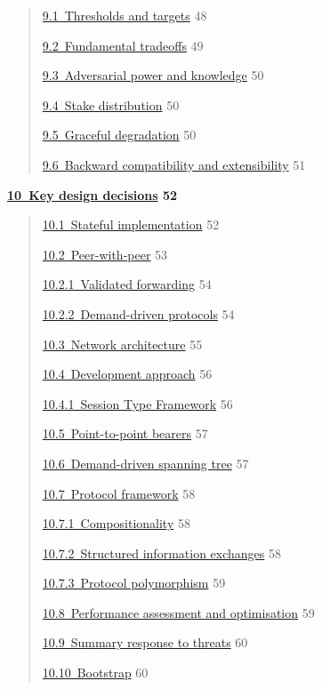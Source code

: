 \documentclass[]{article}
\begin{document}
\begin{quote}
\protect\hyperlink{thresholds-and-targets}{​9.1​~Thresholds and targets}
48

\protect\hyperlink{fundamental-tradeoffs}{​9.2​~Fundamental tradeoffs}
49

\protect\hyperlink{adversarial-power-and-knowledge}{​9.3​~Adversarial
power and knowledge} 50

\protect\hyperlink{stake-distribution}{​9.4​~Stake distribution} 50

\protect\hyperlink{graceful-degradation}{​9.5​~Graceful degradation} 50

\protect\hyperlink{backward-compatibility-and-extensibility}{​9.6​~Backward
compatibility and extensibility} 51
\end{quote}

\textbf{\protect\hyperlink{key-design-decisions}{​10​~Key design
decisions} 52}

\begin{quote}
\protect\hyperlink{stateful-implementation}{​10.1​~Stateful
implementation} 52

\protect\hyperlink{peer-with-peer}{​10.2​~Peer-with-peer} 53

\protect\hyperlink{validated-forwarding}{​10.2.1​~Validated forwarding}
54

\protect\hyperlink{demand-driven-protocols}{​10.2.2​~Demand-driven
protocols} 54

\protect\hyperlink{network-architecture}{​10.3​~Network architecture} 55

\protect\hyperlink{development-approach}{​10.4​~Development approach} 56

\protect\hyperlink{session-type-framework}{​10.4.1​~Session Type
Framework} 56

\protect\hyperlink{point-to-point-bearers}{​10.5​~Point-to-point
bearers} 57

\protect\hyperlink{demand-driven-spanning-tree}{​10.6​~Demand-driven
spanning tree} 57

\protect\hyperlink{protocol-framework}{​10.7​~Protocol framework} 58

\protect\hyperlink{compositionality}{​10.7.1​~Compositionality} 58

\protect\hyperlink{structured-information-exchanges}{​10.7.2​~Structured
information exchanges} 58

\protect\hyperlink{protocol-polymorphism}{​10.7.3​~Protocol
polymorphism} 59

\protect\hyperlink{performance-assessment-and-optimisation}{​10.8​~Performance
assessment and optimisation} 59

\protect\hyperlink{summary-response-to-threats}{​10.9​~Summary response
to threats} 60

\protect\hyperlink{bootstrap}{​10.10​~Bootstrap} 60
\end{quote}
\end{document}

